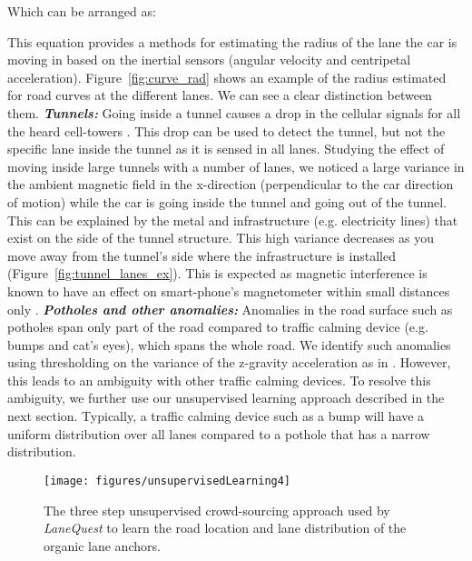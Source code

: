 \documentclass[10pt, conference, compsocconf]{IEEEtran}
\def \sys {\textit{LaneQuest}}
\newcommand{\figscale}{0.7}
\begin{document}
Which can be arranged as:

This equation provides a methods for estimating the radius of the lane the car is moving in based on the inertial sensors (angular velocity and centripetal acceleration).
Figure~\ref{fig:curve_rad} shows an example of the radius estimated for road curves at the different lanes. We can see a clear distinction between them.  
\noindent\textbf{\textit{Tunnels:}}
Going inside a tunnel causes a drop in the cellular signals for all the heard cell-towers \cite{aly2013dejavu}. This drop can be used to detect the tunnel, but not the specific lane inside the tunnel as it is sensed in all lanes. Studying the effect of moving inside large tunnels with a number of lanes, we noticed a large variance in the ambient magnetic field in the x-direction (perpendicular to the car direction of motion) while the car is going inside the tunnel and going out of the tunnel. This can be explained by the metal and infrastructure (e.g. electricity lines) that exist on the side of the tunnel structure. This high variance decreases as you move away from the tunnel's side where the infrastructure is installed (Figure~\ref{fig:tunnel_lanes_ex}). This is expected as magnetic interference is known to have an effect on smart-phone's magnetometer within small distances only \cite{chung2011indoor}. 
\noindent\textbf{\textit{Potholes and other anomalies:}}
Anomalies in the road surface such as potholes span only part of the road compared to traffic calming device (e.g. bumps and cat's eyes), which spans the whole road. We identify such anomalies
using thresholding on the variance of the z-gravity acceleration as in \cite{mednis2011real}. However, this leads to an ambiguity with other traffic calming devices. To resolve this ambiguity, we further use our unsupervised learning approach described in the next section. Typically, a traffic calming device such as a bump will have a uniform distribution over all lanes compared to a pothole that has a narrow distribution. 
\begin{figure}[!t]
\centering
\texttt{[image: figures/unsupervisedLearning4]}
\caption{The three step unsupervised crowd-sourcing  approach used by \sys{} to learn the road location and lane distribution of the organic lane anchors.}
\label{fig:ulearn}
\end{figure}
\end{document}
